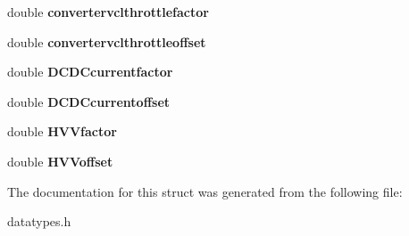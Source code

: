 \begin{DoxyCompactItemize}
\item 
\hypertarget{structconfigdata_aafef7093618a3b3aec08d64d398f0ae5}{}double {\bfseries convertervclthrottlefactor}\label{structconfigdata_aafef7093618a3b3aec08d64d398f0ae5}

\item 
\hypertarget{structconfigdata_a400bedd44e95eae173130cddd89687ab}{}double {\bfseries convertervclthrottleoffset}\label{structconfigdata_a400bedd44e95eae173130cddd89687ab}

\item 
\hypertarget{structconfigdata_a2cf7aa8bc742d88b0dfafa51a7c9c6b2}{}double {\bfseries D\+C\+D\+Ccurrentfactor}\label{structconfigdata_a2cf7aa8bc742d88b0dfafa51a7c9c6b2}

\item 
\hypertarget{structconfigdata_a51b07aecd418372f0b61a6f64ecf32f9}{}double {\bfseries D\+C\+D\+Ccurrentoffset}\label{structconfigdata_a51b07aecd418372f0b61a6f64ecf32f9}

\item 
\hypertarget{structconfigdata_a96f4ae84d86e407c9d2022ece6ceac69}{}double {\bfseries H\+V\+Vfactor}\label{structconfigdata_a96f4ae84d86e407c9d2022ece6ceac69}

\item 
\hypertarget{structconfigdata_a90c485f0da136b9c4bc7bd7326c0c652}{}double {\bfseries H\+V\+Voffset}\label{structconfigdata_a90c485f0da136b9c4bc7bd7326c0c652}

\end{DoxyCompactItemize}


The documentation for this struct was generated from the following file\+:\begin{DoxyCompactItemize}
\item 
datatypes.\+h\end{DoxyCompactItemize}
